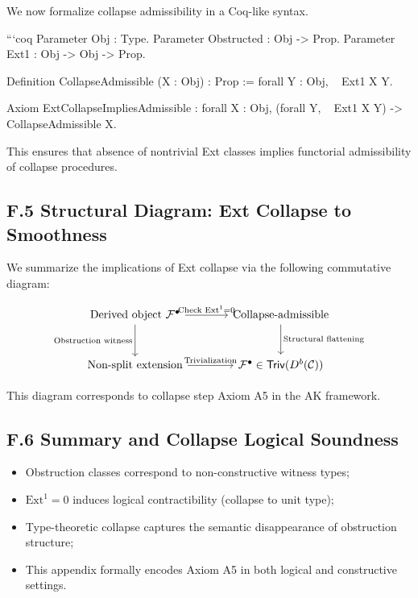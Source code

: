\documentclass[11pt]{article}
\begin{document}
We now formalize collapse admissibility in a Coq-like syntax.

```coq
Parameter Obj : Type.
Parameter Obstructed : Obj -> Prop.
Parameter Ext1 : Obj -> Obj -> Prop.

Definition CollapseAdmissible (X : Obj) : Prop :=
  forall Y : Obj,
    ~ Ext1 X Y.

Axiom ExtCollapseImpliesAdmissible :
  forall X : Obj,
    (forall Y, ~ Ext1 X Y) ->
    CollapseAdmissible X.

This ensures that absence of nontrivial Ext classes implies
functorial admissibility of collapse procedures.

\subsection*{F.5 Structural Diagram: Ext Collapse to Smoothness}

We summarize the implications of Ext collapse via the following commutative diagram:

\[
\begin{tikzcd}[row sep=large, column sep=large]
\text{Derived object } \mathcal{F}^\bullet \arrow[r, "\text{Check } \mathrm{Ext}^1 = 0"] \arrow[d, swap, "\text{Obstruction witness}"]
& \text{Collapse-admissible} \arrow[d, "\text{Structural flattening}"] \\
\text{Non-split extension} \arrow[r, "\text{Trivialization}"]
& \mathcal{F}^\bullet \in \mathsf{Triv}(D^b(\mathcal{C}))
\end{tikzcd}
\]

This diagram corresponds to collapse step Axiom A5 in the AK framework.

\subsection*{F.6 Summary and Collapse Logical Soundness}

\begin{itemize}
  \item Obstruction classes correspond to non-constructive witness types;
  \item \( \mathrm{Ext}^1 = 0 \) induces logical contractibility (collapse to unit type);
  \item Type-theoretic collapse captures the semantic disappearance of obstruction structure;
  \item This appendix formally encodes Axiom A5 in both logical and constructive settings.
\end{itemize}
\end{document}
